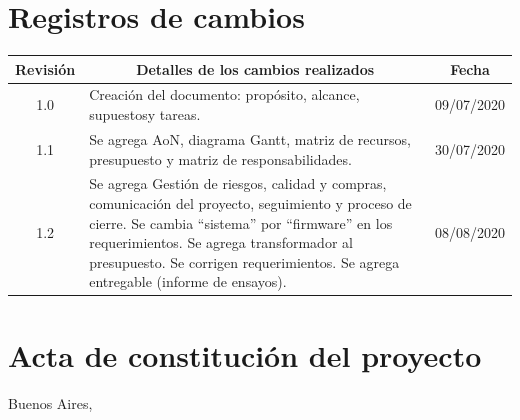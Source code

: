 \documentclass[11pt]{charter}
\begin{document}
\maketitle
\thispagestyle{empty}
\pagebreak


\thispagestyle{empty}
{\setlength{\parskip}{0pt}
\tableofcontents{}
}
\pagebreak


\section{Registros de cambios}
\label{sec:registro}


\begin{table}[ht]
\label{tab:registro}
\centering

\begin{tabularx}{\linewidth}{@{}|c|X|c|@{}}
\hline
\rowcolor[HTML]{C0C0C0} 
Revisión & \multicolumn{1}{c|}{\cellcolor[HTML]{C0C0C0}Detalles de los cambios realizados} & Fecha      \\ \hline
1.0      & Creación del documento: propósito, alcance, supuestos\newline                                                        y tareas. & 09/07/2020 \\ \hline
1.1      & Se agrega AoN, diagrama Gantt, matriz de recursos,\newline
presupuesto y matriz de responsabilidades. & 30/07/2020 \\ \hline
1.2      & Se agrega Gestión de riesgos, calidad y compras, comunicación \newline
del proyecto, seguimiento y proceso de cierre. \newline 
Se cambia ``sistema'' por ``firmware'' en los requerimientos. \newline
Se agrega transformador al presupuesto. \newline
Se corrigen requerimientos. \newline
Se agrega entregable (informe de ensayos). & 08/08/2020 \\ \hline
\end{tabularx}
\end{table}

\pagebreak



\section{Acta de constitución del proyecto}
\label{sec:acta}

\begin{flushright}
Buenos Aires, \fechaInicioName
\end{flushright}
\end{document}

